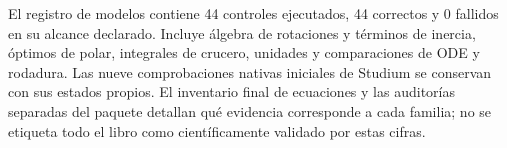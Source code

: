 \noindent El registro de modelos contiene 44 controles ejecutados, 44 correctos y 0 fallidos en su alcance declarado. Incluye álgebra de rotaciones y términos de inercia, óptimos de polar, integrales de crucero, unidades y comparaciones de ODE y rodadura. Las nueve comprobaciones nativas iniciales de Studium se conservan con sus estados propios. El inventario final de ecuaciones y las auditorías separadas del paquete detallan qué evidencia corresponde a cada familia; no se etiqueta todo el libro como científicamente validado por estas cifras.